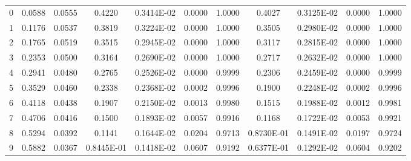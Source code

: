 \documentclass[
twocolumn,
aps,prd,
nofootinbib,
superscriptaddress,
showpacs,ligh
tightenlines, 
]{revtex4}
\begin{document}
\begin{widetext}
\begin{table}[h]
\begin{center}
\begin{tabular}{|c|c|c|c|c|c|c|c|c|c|c|}
     0                 &        0.0588             &        0.0555             &     0.4220                 &     0.3414E-02             &        0.0000             &        1.0000             & 0.4027 & 0.3125E-02 & 0.0000 & 1.0000 \\
      1                 &        0.1176             &        0.0537             &     0.3819                 &     0.3224E-02             &        0.0000             &        1.0000             & 0.3505 & 0.2980E-02 & 0.0000 & 1.0000 \\
      2                &        0.1765             &        0.0519             &     0.3515                 &     0.2945E-02             &        0.0000             &        1.0000             & 0.3117 & 0.2815E-02 & 0.0000 & 1.0000 \\
      3                 &        0.2353             &        0.0500             &     0.3164                 &     0.2690E-02             &        0.0000             &        1.0000             & 0.2717 & 0.2632E-02 & 0.0000 & 1.0000 \\
      4                 &        0.2941             &        0.0480             &     0.2765                 &     0.2526E-02             &        0.0000             &        0.9999             & 0.2306 & 0.2459E-02 & 0.0000 & 0.9999 \\
      5                 &        0.3529             &        0.0460             &     0.2338                 &     0.2368E-02             &        0.0002             &        0.9996             & 0.1900 & 0.2248E-02 & 0.0002 & 0.9996 \\
      6                 &        0.4118             &        0.0438             &     0.1907                 &     0.2150E-02             &        0.0013             &        0.9980             & 0.1515 & 0.1988E-02 & 0.0012 & 0.9981 \\
      7                 &        0.4706             &        0.0416             &     0.1500                 &     0.1893E-02             &        0.0057             &        0.9916             & 0.1168 & 0.1722E-02 & 0.0053 & 0.9921 \\
      8                 &        0.5294             &        0.0392             &     0.1141                 &     0.1644E-02             &        0.0204             &        0.9713             & 0.8730E-01 & 0.1491E-02 & 0.0197 & 0.9724 \\
      9                 &        0.5882             &        0.0367             &     0.8445E-01             &     0.1418E-02             &        0.0607             &        0.9192             & 0.6377E-01 & 0.1292E-02 & 0.0604 & 0.9202 \\

\end{tabular}
\end{center}
\end{table}
\end{widetext}
\end{document}
